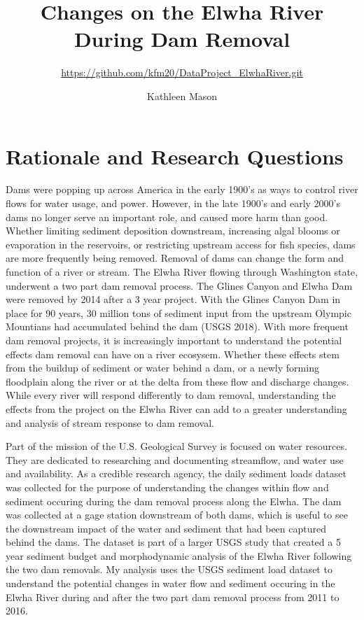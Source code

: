 \documentclass[12pt,]{article}
\title{Changes on the Elwha River During Dam Removal}
\subtitle{\url{https://github.com/kfm20/DataProject_ElwhaRiver.git}}
\author{Kathleen Mason}
\date{}
\begin{document}
\maketitle

\newpage
\tableofcontents 
\newpage
\listoffigures 
\newpage

\hypertarget{rationale-and-research-questions}{%
\section{Rationale and Research
Questions}\label{rationale-and-research-questions}}

Dams were popping up across America in the early 1900's as ways to
control river flows for water usage, and power. However, in the late
1900's and early 2000's dams no longer serve an important role, and
caused more harm than good. Whether limiting sediment deposition
downstream, increasing algal blooms or evaporation in the reservoirs, or
restricting upstream access for fish species, dams are more frequently
being removed. Removal of dams can change the form and function of a
river or stream. The Elwha River flowing through Washington state,
underwent a two part dam removal process. The Glines Canyon and Elwha
Dam were removed by 2014 after a 3 year project. With the Glines Canyon
Dam in place for 90 years, 30 million tons of sediment input from the
upstream Olympic Mountians had accumulated behind the dam (USGS 2018).
With more frequent dam removal projects, it is increasingly important to
understand the potential effects dam removal can have on a river
ecosysem. Whether these effects stem from the buildup of sediment or
water behind a dam, or a newly forming floodplain along the river or at
the delta from these flow and discharge changes. While every river will
respond differently to dam removal, understanding the effects from the
project on the Elwha River can add to a greater understanding and
analysis of stream response to dam removal.

Part of the mission of the U.S. Geological Survey is focused on water
resources. They are dedicated to researching and documenting streamflow,
and water use and availability. As a credible research agency, the daily
sediment loads dataset was collected for the purpose of understanding
the changes within flow and sediment occuring during the dam removal
process along the Elwha. The dam was collected at a gage station
downstream of both dams, which is useful to see the downstream impact of
the water and sediment that had been captured behind the dams. The
dataset is part of a larger USGS study that created a 5 year sediment
budget and morphodynamic analysis of the Elwha River following the two
dam removals. My analysis uses the USGS sediment load dataset to
understand the potential changes in water flow and sediment occuring in
the Elwha River during and after the two part dam removal process from
2011 to 2016.
\end{document}
